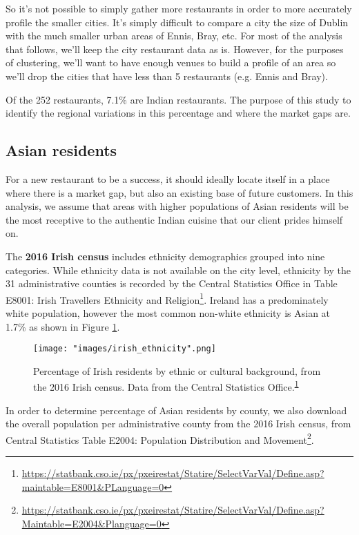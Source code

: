 \documentclass[a4paper,11pt]{article}
\begin{document}
So it's not possible to simply gather more restaurants in order to more accurately profile the smaller cities. It's simply difficult to compare a city the size of Dublin with the much smaller urban areas of Ennis, Bray, etc. For most of the analysis that follows, we'll keep the city restaurant data as is. However, for the purposes of clustering, we'll want to have enough venues to build a profile of an area so we'll drop the cities that have less than 5 restaurants (e.g. Ennis and Bray).

Of the 252 restaurants, 7.1\% are Indian restaurants. The purpose of this study to identify the regional variations in this percentage and where the market gaps are.

\subsection{Asian residents}

For a new restaurant to be a success, it should ideally locate itself in a place where there is a market gap, but also an existing base of future customers. In this analysis, we assume that areas with higher populations of Asian residents will be the most receptive to the authentic Indian cuisine that our client prides himself on. 

The \textbf{2016 Irish census} includes ethnicity demographics grouped into nine categories. While ethnicity data is not available on the city level, ethnicity by the 31 administrative counties is recorded by the Central Statistics Office in Table E8001: Irish Travellers Ethnicity and Religion\footnote{\url{https://statbank.cso.ie/px/pxeirestat/Statire/SelectVarVal/Define.asp?maintable=E8001&PLanguage=0}\label{footnote:irish ethnicity}}. Ireland has a predominately white population, however the most common non-white ethnicity is Asian at 1.7\% as shown in Figure \ref{fig:irish ethnicity}. 

\begin{figure}[htb]
   \centering
   \texttt{[image: "images/irish\_ethnicity".png]}
      \caption{Percentage of Irish residents by ethnic or cultural background, from the 2016 Irish census. Data from the Central Statistics Office.\textsuperscript{\ref{footnote:irish ethnicity}}}
      \label{fig:irish ethnicity}
\end{figure}

In order to determine percentage of Asian residents by county, we also download the overall population per administrative county from the 2016 Irish census, from Central Statistics Table E2004: Population Distribution and Movement\footnote{\url{https://statbank.cso.ie/px/pxeirestat/Statire/SelectVarVal/Define.asp?Maintable=E2004&Planguage=0}}.
\end{document}
